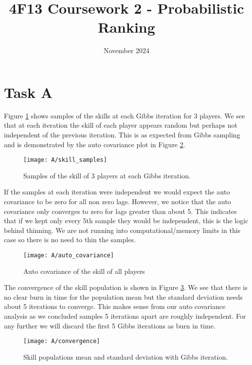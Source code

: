 \documentclass[11pt]{article}
\title{\vspace{-2cm}4F13 Coursework 2 - Probabilistic Ranking}
\author{}
\date{November 2024}
\begin{document}
% 

\setcounter{page}{1}

\maketitle

\section{Task A}

Figure \ref{fig:A_skill_samples} shows samples of the skills at each Gibbs iteration for 3 players. We see that at each iteration the skill of each player appears random but perhaps not independent of the previous iteration. This is as expected from Gibbs sampling and is demonstrated by the auto covariance plot in Figure \ref{fig:A_auto_covariance}. 

\begin{figure}[h]
    \centering
    \texttt{[image: A/skill\_samples]} 
    \caption{Samples of the skill of 3 players at each Gibbs iteration.}
    \label{fig:A_skill_samples}
\end{figure}

If the samples at each iteration were independent we would expect the auto covariance to be zero for all non zero lags. However, we notice that the auto covariance only converges to zero for lags greater than about 5. This indicates that if we kept only every 5th sample they would be independent, this is the logic behind thinning. We are not running into computational/memory limits in this case so there is no need to thin the samples.

\begin{figure}[h]
    \centering
    \texttt{[image: A/auto\_covariance]} 
    \caption{Auto covariance of the skill of all players}
    \label{fig:A_auto_covariance}
\end{figure}

The convergence of the skill population is shown in Figure \ref{fig:A_convergence}. We see that there is no clear burn in time for the population mean but the standard deviation needs about 5 iterations to converge. This makes sense from our auto covariance analysis as we concluded samples 5 iterations apart are roughly independent. For any further we will discard the first 5 Gibbs iterations as burn in time.

\begin{figure}[h]
    \centering
    \texttt{[image: A/convergence]} 
    \caption{Skill populations mean and standard deviation with Gibbs iteration.}
    \label{fig:A_convergence}
\end{figure}
\end{document}
